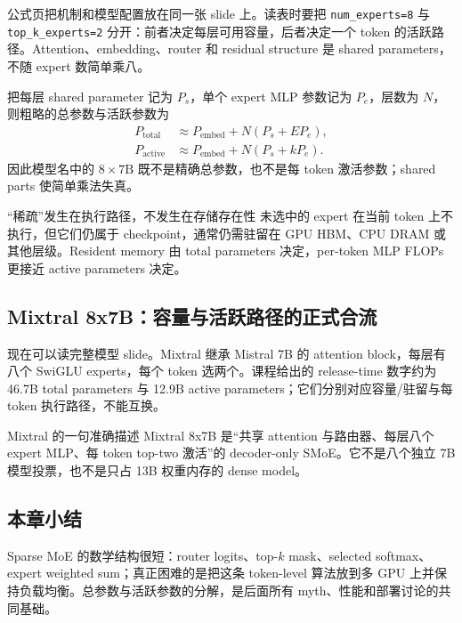 公式页把机制和模型配置放在同一张 slide 上。读表时要把 \texttt{num\_experts=8} 与 \texttt{top\_k\_experts=2} 分开：前者决定每层可用容量，后者决定一个 token 的活跃路径。Attention、embedding、router 和 residual structure 是 shared parameters，不随 expert 数简单乘八。


把每层 shared parameter 记为 $P_s$，单个 expert MLP 参数记为 $P_e$，层数为 $N$，则粗略的总参数与活跃参数为
\begin{align*}
P_{\text{total}} &\approx P_{\text{embed}}+N(P_s+E P_e),\\
P_{\text{active}} &\approx P_{\text{embed}}+N(P_s+k P_e).
\end{align*}
因此模型名中的 $8\times 7\mathrm{B}$ 既不是精确总参数，也不是每 token 激活参数；shared parts 使简单乘法失真。

\begin{warningbox}{“稀疏”发生在执行路径，不发生在存储存在性}
未选中的 expert 在当前 token 上不执行，但它们仍属于 checkpoint，通常仍需驻留在 GPU HBM、CPU DRAM 或其他层级。Resident memory 由 total parameters 决定，per-token MLP FLOPs 更接近 active parameters 决定。
\end{warningbox}

\subsection{Mixtral 8x7B：容量与活跃路径的正式合流}

现在可以读完整模型 slide。Mixtral 继承 Mistral 7B 的 attention block，每层有八个 SwiGLU experts，每个 token 选两个。课程给出的 release-time 数字约为 46.7B total parameters 与 12.9B active parameters；它们分别对应容量/驻留与每 token 执行路径，不能互换。


\begin{importantbox}{Mixtral 的一句准确描述}
Mixtral 8x7B 是“共享 attention 与路由器、每层八个 expert MLP、每 token top-two 激活”的 decoder-only SMoE。它不是八个独立 7B 模型投票，也不是只占 13B 权重内存的 dense model。
\end{importantbox}


\subsection{本章小结}

Sparse MoE 的数学结构很短：router logits、top-$k$ mask、selected softmax、expert weighted sum；真正困难的是把这条 token-level 算法放到多 GPU 上并保持负载均衡。总参数与活跃参数的分解，是后面所有 myth、性能和部署讨论的共同基础。

